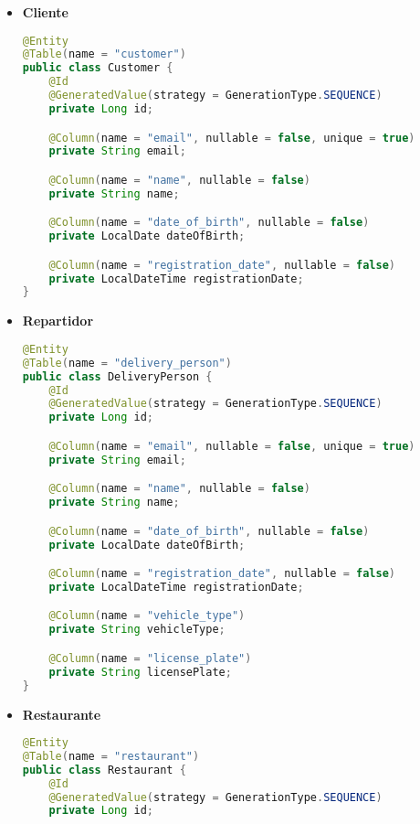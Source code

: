 \begin{itemize}

\item \textbf{Cliente}

\begin{lstlisting}[style=common, language=Java]
@Entity
@Table(name = "customer")
public class Customer {
    @Id
    @GeneratedValue(strategy = GenerationType.SEQUENCE)
    private Long id;

    @Column(name = "email", nullable = false, unique = true)
    private String email;

    @Column(name = "name", nullable = false)
    private String name;

    @Column(name = "date_of_birth", nullable = false)
    private LocalDate dateOfBirth;

    @Column(name = "registration_date", nullable = false)
    private LocalDateTime registrationDate;
}
\end{lstlisting}


\item \textbf{Repartidor}

\begin{lstlisting}[style=common, language=Java]
@Entity
@Table(name = "delivery_person")
public class DeliveryPerson {
    @Id
    @GeneratedValue(strategy = GenerationType.SEQUENCE)
    private Long id;

    @Column(name = "email", nullable = false, unique = true)
    private String email;

    @Column(name = "name", nullable = false)
    private String name;

    @Column(name = "date_of_birth", nullable = false)
    private LocalDate dateOfBirth;

    @Column(name = "registration_date", nullable = false)
    private LocalDateTime registrationDate;

    @Column(name = "vehicle_type")
    private String vehicleType;

    @Column(name = "license_plate")
    private String licensePlate;
}
\end{lstlisting}


\item \textbf{Restaurante}

\begin{lstlisting}[style=common, language=Java]
@Entity
@Table(name = "restaurant")
public class Restaurant {
    @Id
    @GeneratedValue(strategy = GenerationType.SEQUENCE)
    private Long id;


\end{lstlisting}
\end{itemize}
